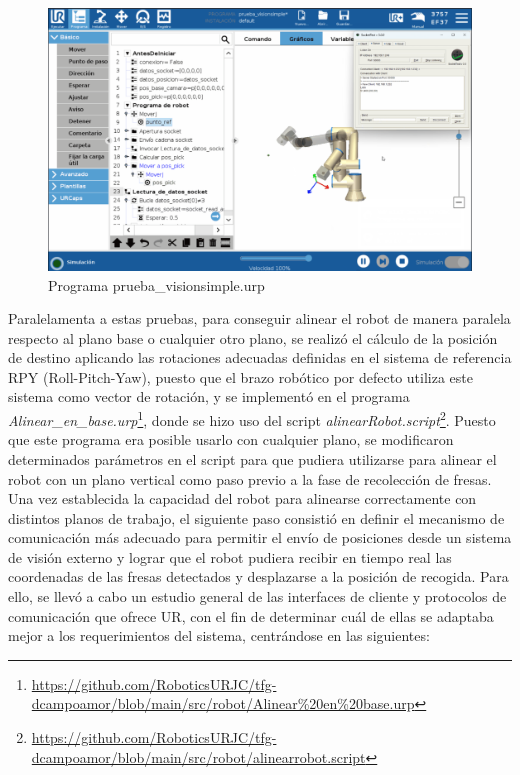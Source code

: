   \begin{figure}[H]
     \centering
     \begin{center}
       \includegraphics[width=130mm]{figs/prueba_visionsimple.png}
     \end{center}
     \caption{Programa prueba\_visionsimple.urp}
     \label{fig:prueba_visionsimple}
  \end{figure}
  
Paralelamenta a estas pruebas, para conseguir alinear el robot de manera paralela respecto al plano base o cualquier otro plano, se realizó el cálculo de la posición de destino aplicando las rotaciones adecuadas definidas en el sistema de referencia RPY (Roll-Pitch-Yaw), puesto que el brazo robótico por defecto utiliza este sistema como vector de rotación, y se implementó en el programa \textit{Alinear\_en\_base.urp}\footnote{\url{https://github.com/RoboticsURJC/tfg-dcampoamor/blob/main/src/robot/Alinear\%20en\%20base.urp}}, donde se hizo uso del script \textit{alinearRobot.script}\footnote{\url{https://github.com/RoboticsURJC/tfg-dcampoamor/blob/main/src/robot/alinearrobot.script}}. Puesto que este programa era posible usarlo con cualquier plano, se modificaron determinados parámetros en el script para que pudiera utilizarse para alinear el robot con un plano vertical como paso previo a la fase de recolección de fresas.\\

Una vez establecida la capacidad del robot para alinearse correctamente con distintos planos de trabajo, el siguiente paso consistió en definir el mecanismo de comunicación más adecuado para permitir el envío de posiciones desde un sistema de visión externo y lograr que el robot pudiera recibir en tiempo real las coordenadas de las fresas detectados y desplazarse a la posición de recogida. Para ello, se llevó a cabo un estudio general de las interfaces de cliente y protocolos de comunicación que ofrece UR, con el fin de determinar cuál de ellas se adaptaba mejor a los requerimientos del sistema, centrándose en las siguientes:

